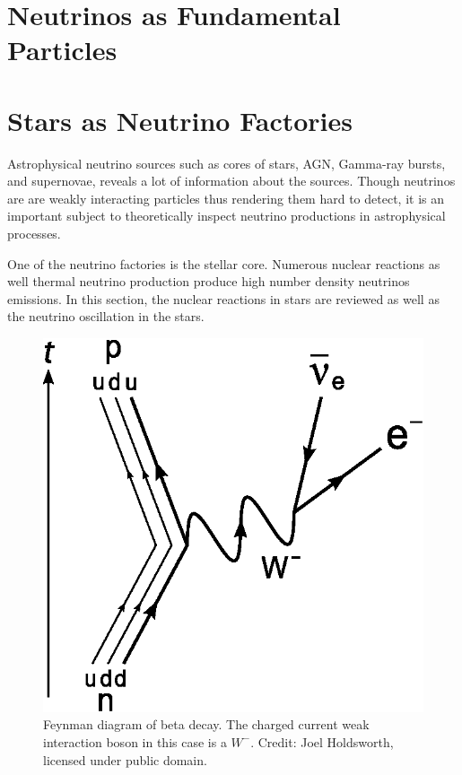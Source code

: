 \section{\label{chap:basics-section:neutrinos}Neutrinos as Fundamental Particles}




\section{\label{chap:basics-section:astro}Stars as Neutrino Factories}

Astrophysical neutrino sources such as cores of stars, AGN, Gamma-ray bursts, and supernovae, reveals a lot of information about the sources. Though neutrinos are are weakly interacting particles thus rendering them hard to detect, it is an important subject to theoretically inspect neutrino productions in astrophysical processes.

One of the neutrino factories is the stellar core. Numerous nuclear reactions as well thermal neutrino production produce high number density neutrinos emissions. In this section, the nuclear reactions in stars are reviewed as well as the neutrino oscillation in the stars.

\begin{figure}[ht]
\centering
\includegraphics{chapters/assets/solar/Beta_Negative_Decay.eps}
\caption{Feynman diagram of beta decay. The charged current weak interaction boson in this case is a $W^-$. Credit: Joel Holdsworth, licensed under public domain.}
\label{fig:Beta_Negative_Decay}
\end{figure}

